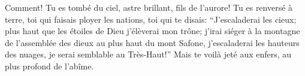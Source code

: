 Comment! Tu es tombé du ciel, astre brillant, fils de l’aurore!
	Tu es renversé à terre, toi qui faisais ployer les nations,
	toi qui te disais: “J’escaladerai les cieux;
	plus haut que les étoiles de Dieu j’élèverai mon trône;
	j’irai siéger à la montagne de l’assemblée des dieux
		au plus haut du mont Safone,
	j’escaladerai les hauteurs des nuages, je serai semblable au Très-Haut!”
Mais te voilà jeté aux enfers, au plus profond de l’abîme.
